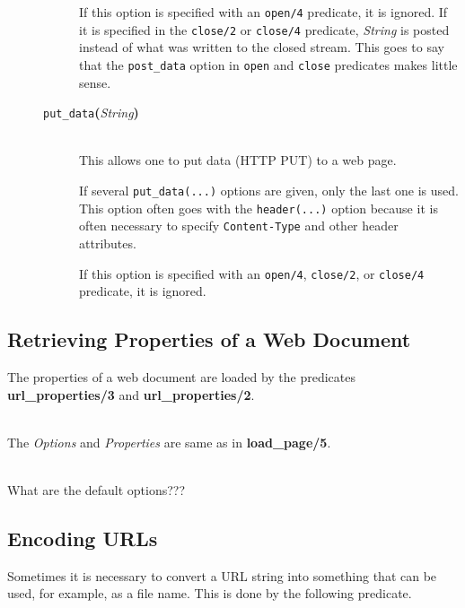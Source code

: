 \begin{description}
\begin{description}
    If this option is specified with an \texttt{open/4} predicate, it is
    ignored.  If it is specified in the \texttt{close/2} or 
    \texttt{close/4}   predicate, \emph{String} is posted instead of what was
    written to the closed stream. This goes to say that the \texttt{post\_data}
    option in \texttt{open} and \texttt{close} predicates makes little sense. 
    \item[{\tt put\_data}{\bf (}{\it String}{\bf )}]\mbox{}\\
    This allows one to put data (HTTP PUT) to a web page.

    If several \texttt{put\_data(...)} options are given, only the last one is
    used. This option often goes with the \texttt{header(...)} option because it
    is often necessary to specify \texttt{Content-Type} and other header
    attributes.  

    If this option is specified with an \texttt{open/4},
    \texttt{close/2}, or \texttt{close/4} predicate, it is
    ignored.
  \end{description}

\end{description}

\subsection{Retrieving Properties of a Web Document}

The properties of a web document are loaded by the predicates {\bf
  url\_properties/3} and {\bf url\_properties/2}. 

\begin{description}
\item[url\_properties({\it +Url, +Options, -Properties})]\mbox{}
  \\
  The {\it Options} and {\it Properties} are same as in {\bf load\_page/5}.
\item[url\_properties({\it +Url, -Properties})]\mbox{}
  \\
  What are the default options???

\end{description}

\subsection{Encoding URLs}

Sometimes it is necessary to convert a URL string into something that can
be used, for example, as a file name. This is done by the following
predicate.

